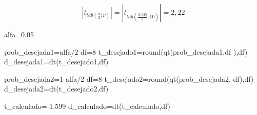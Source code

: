 \documentclass[
]{book}
\newenvironment{Shaded}{\begin{snugshade}}{\end{snugshade}}
\newcommand{\DecValTok}[1]{\textcolor[rgb]{0.00,0.00,0.81}{#1}}
\newcommand{\FloatTok}[1]{\textcolor[rgb]{0.00,0.00,0.81}{#1}}
\newcommand{\FunctionTok}[1]{\textcolor[rgb]{0.00,0.00,0.00}{#1}}
\newcommand{\NormalTok}[1]{#1}
\newcommand{\OtherTok}[1]{\textcolor[rgb]{0.56,0.35,0.01}{#1}}
\newcommand{\SpecialCharTok}[1]{\textcolor[rgb]{0.00,0.00,0.00}{#1}}
\begin{document}
\[
|{t}_{tab \left(\frac{\alpha }{2};\nu \right)}| = |{t}_{tab \left(\frac{0,025}{2};10 \right)}| = 2,22
\]

\hfill\break

\begin{Shaded}
\begin{Highlighting}[]
\NormalTok{alfa}\OtherTok{=}\FloatTok{0.05}

\NormalTok{prob\_desejada1}\OtherTok{=}\NormalTok{alfa}\SpecialCharTok{/}\DecValTok{2}
\NormalTok{df}\OtherTok{=}\DecValTok{8}
\NormalTok{t\_desejado1}\OtherTok{=}\FunctionTok{round}\NormalTok{(}\FunctionTok{qt}\NormalTok{(prob\_desejada1,df ),df)}
\NormalTok{d\_desejada1}\OtherTok{=}\FunctionTok{dt}\NormalTok{(t\_desejado1,df)}

\NormalTok{prob\_desejada2}\OtherTok{=}\DecValTok{1}\SpecialCharTok{{-}}\NormalTok{alfa}\SpecialCharTok{/}\DecValTok{2}
\NormalTok{df}\OtherTok{=}\DecValTok{8}
\NormalTok{t\_desejado2}\OtherTok{=}\FunctionTok{round}\NormalTok{(}\FunctionTok{qt}\NormalTok{(prob\_desejada2, df),df)}
\NormalTok{d\_desejada2}\OtherTok{=}\FunctionTok{dt}\NormalTok{(t\_desejado2,df)}

\NormalTok{t\_calculado}\OtherTok{=}\SpecialCharTok{{-}}\FloatTok{1.599}
\NormalTok{d\_calculado}\OtherTok{=}\FunctionTok{dt}\NormalTok{(t\_calculado,df)}



\end{Highlighting}
\end{Shaded}
\end{document}
